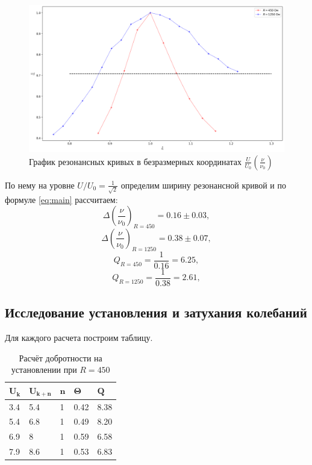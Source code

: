 \documentclass{lab}
\begin{document}
\begin{figure}[bth]
    \centering
    \includegraphics[width=1\linewidth]{G3}
    \caption{График резонансных кривых в безразмерных координатах $\frac{U}{U_0}(\frac{\nu}{\nu_0})$}
    \label{fig:graph}
\end{figure}
По нему на уровне $ U/U_0 = \frac{1}{\sqrt{2}}  $ определим ширину резонансной кривой и по формуле \eqref{eq:main} рассчитаем:
\begin{equation*}
    \Delta (\frac{\nu}{\nu_0})_{R=450} = 0.16 \pm 0.03,
\end{equation*}
\begin{equation*}
    \Delta (\frac{\nu}{\nu_0})_{R=1250} = 0.38 \pm 0.07 ,
\end{equation*}
\begin{equation}
    Q_{R=450} = \frac{1}{0.16} = 6.25,
\end{equation}
\begin{equation}
    Q_{R=1250} = \frac{1}{0.38} = 2.61,
\end{equation}

\subsection{Исследование установления и затухания колебаний}

Для каждого расчета построим таблицу.

\begin{table}[h!]
    \centering
    \begin{tabular}{|l|l|l|l|l|}
        \hline
        $\mathbf{U_k}$ & $\mathbf{U_{k+n}}$ & $\mathbf{n}$ & $\mathbf{\Theta}$ & $\mathbf{Q}$  \\ \hline
        3.4   & 5.4     & 1   & 0.42 & 8.38  \\ \hline
        5.4   & 6.8     & 1   & 0.49 & 8.20  \\ \hline
        6.9   & 8       & 1   & 0.59 & 6.58  \\ \hline
        7.9   & 8.6     & 1   & 0.53 & 6.83 \\ \hline
    \end{tabular}
    \caption{Расчёт добротности на установлении при $R=450$}
\end{table}
\end{document}
